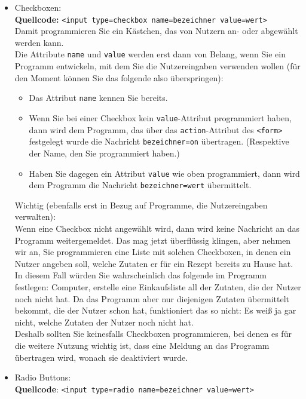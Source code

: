 \begin{itemize}
	\item Checkboxen:\\

	\textbf{Quellcode:} \verb|<input type=checkbox name=bezeichner value=wert>|\\

	Damit programmieren Sie ein Kästchen, das von Nutzern an- oder abgewählt werden kann.\\
	Die Attribute \verb|name| und \verb|value| werden erst dann von Belang, wenn Sie ein Programm entwickeln, mit dem Sie die Nutzereingaben verwenden wollen (für den Moment können Sie das folgende also überspringen): 
	
	\begin{itemize}
		\item Das Attribut \verb|name| kennen Sie bereits. 
		\item Wenn Sie bei einer Checkbox kein \verb|value|-Attribut programmiert haben, dann wird dem Programm, das über das \verb|action|-Attribut des \verb|<form>| festgelegt wurde die Nachricht \verb|bezeichner=on| übertragen. (Respektive der Name, den Sie programmiert haben.)
		\item Haben Sie dagegen ein Attribut \verb|value| wie oben programmiert, dann wird dem Programm die Nachricht \verb|bezeichner=wert| übermittelt.\\
	\end{itemize}
	
	Wichtig (ebenfalls erst in Bezug auf Programme, die Nutzereingaben verwalten):\\
	
	Wenn eine Checkbox nicht angewählt wird, dann wird keine Nachricht an das Programm weitergemeldet. Das mag jetzt überflüssig klingen, aber nehmen wir an, Sie programmieren eine Liste mit solchen Checkboxen, in denen ein Nutzer angeben soll, welche Zutaten er für ein Rezept bereits zu Hause hat. In diesem Fall würden Sie wahrscheinlich das folgende im Programm festlegen: Computer, erstelle eine Einkaufsliste all der Zutaten, die der Nutzer noch nicht hat. Da das Programm aber nur diejenigen Zutaten übermittelt bekommt, die der Nutzer schon hat, funktioniert das so nicht: Es weiß ja gar nicht, welche Zutaten der Nutzer noch nicht hat.\\

	Deshalb sollten Sie keinesfalls Checkboxen programmieren, bei denen es für die weitere Nutzung wichtig ist, dass eine Meldung an das Programm übertragen wird, wonach sie deaktiviert wurde.\\

	\item Radio Buttons:\\

	\textbf{Quellcode}: \verb|<input type=radio name=bezeichner value=wert>|\\

\end{itemize}

